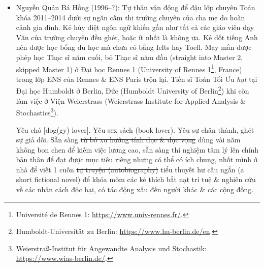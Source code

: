 \documentclass[12pt]{article}
\begin{document}
\begin{itemize}
	\item {\sc Nguyễn Quản Bá Hồng} (1996--?): Tự thân vận động để đậu lớp chuyên Toán khóa 2011--2014 dưới sự ngăn cấm thi trường chuyên của cha mẹ do hoàn cảnh gia đình. Kẻ hủy diệt ngôn ngữ khiến gần như tất cả các giáo viên dạy Văn của trường chuyên đều ghét, hoặc ít nhất là không ưa. Kẻ dốt tiếng Anh nên được học bổng du học mà chưa có bằng {\sc Ielts} hay {\sc Toefl}. May mắn được phép học Thạc sĩ năm cuối, bỏ Thạc sĩ năm đầu (straight into Master 2, skipped Master 1) ở Đại học Rennes 1 (University of Rennes 1\footnote{Universit\'e de Rennes 1: \url{https://www.univ-rennes.fr/}.}, France) trong lớp ENS của Rennes \& ENS Paris trộn lại. Tiến sĩ Toán Tối Ưu {\it hụt} tại Đại học Humboldt ở Berlin, Đức (Humboldt University of Berlin\footnote{Humboldt-Universität zu Berlin: \url{https://www.hu-berlin.de/en}.}) khi còn làm việc ở Viện Weierstrass (Weierstrass Institute for Applied Analysis \& Stochastics\footnote{Weierstraß-Institut für Angewandte Analysis und Stochastik: \url{https://www.wias-berlin.de/}.}).
	
	Yêu chó [dog(gy) lover]. Yêu \st{sex} sách (book lover). Yêu sự chân thành, ghét sự giả dối. Sẵn sàng \st{từ bỏ xu hướng tính dục \& dục vọng} dùng vài năm không bon chen để kiếm việc lương cao, sẵn sàng thí nghiệm tâm lý lên chính bản thân để đạt được mục tiêu riêng nhưng có thể có ích chung, nhốt mình ở nhà để viết 1 cuốn \st{tự truyện (autobiography)} tiểu thuyết hư cấu ngắn (a short fictional novel) để khóa mõm các kẻ thích bắt nạt trí tuệ \& nghiên cứu về các nhân cách độc hại, có tác động xấu đến người khác \& các cộng đồng.
	

\end{itemize}
\end{document}
